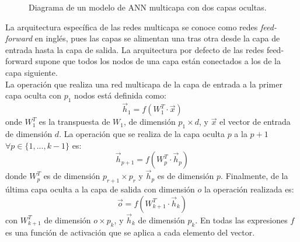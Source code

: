 \begin{figure}[ht]
    \centering
    \caption{Diagrama de un modelo de \acs{ANN} multicapa con dos capas ocultas.}
    \label{fig:nnlayers}
\end{figure}

La arquitectura específica de las redes multicapa se conoce como redes \emph{feed-forward} en inglés, pues las capas se alimentan una tras otra desde la capa de entrada hasta la capa de salida. La arquitectura por defecto de las redes feed-forward supone que todos los nodos de una capa están conectados a los de la capa siguiente. \cite{Nielsen:2018}
\\
La operación que realiza una red multicapa de la capa de entrada a la primer capa oculta con $p_1$ nodos está definida como:
$$\vec{h}_1 = f(W^T_1 \cdot \vec{x})$$
onde $W^T_1$ es la transpuesta de $W_1$, de dimensión $p_1 \times d$, y $\vec{x}$ el vector de entrada de dimensión $d$. La operación que se realiza de la capa oculta $p$ a la $p+1$ $\forall p \in \{1,...,k-1\}$ es:
$$\vec{h}_{p+1} = f(W^T_{p} \cdot \vec{h}_p)$$
donde $W^T_{p}$ es de dimensión $p_{r+1} \times p_r$ y $\vec{h}_p$ es de dimensión $p$. Finalmente, de la última capa oculta a la capa de salida con dimensión $o$ la operación realizada es:
$$\vec{o} = f(W^T_{k+1} \cdot \vec{h}_k)$$
con $W^T_{k+1}$ de dimensión $o \times p_{k}$, y $\vec{h}_k$ de dimensión $p_k$. En todas las expresiones $f$ es una función de activación que se aplica a cada elemento del vector.

